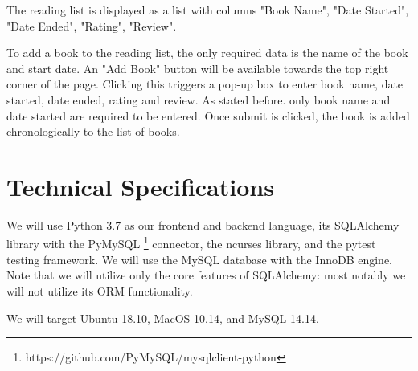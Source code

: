 \documentclass{article}
\begin{document}
The reading list is displayed as a list with columns "Book Name", "Date Started", 
"Date Ended", "Rating", "Review".

To add a book to the reading list, the only required data is the name of the book 
and start date. 
An "Add Book" button will be available towards the top right corner of the page. 
Clicking this triggers a pop-up box to enter book name, date started, date ended, 
rating and review. As stated before. only book name and date started are required 
to be entered. Once submit is clicked, the book is added chronologically to the 
list of books.

\section*{Technical Specifications}

We will use Python 3.7 as our frontend and backend language,
its SQLAlchemy library with the
PyMySQL \footnote{https://github.com/PyMySQL/mysqlclient-python}
connector,
the ncurses library,
and the pytest testing framework.
We will use the MySQL database with the InnoDB engine.
Note that we will utilize only the core features of SQLAlchemy:
most notably we will not utilize its ORM functionality.

We will target Ubuntu 18.10, MacOS 10.14, and MySQL 14.14.
\end{document}
